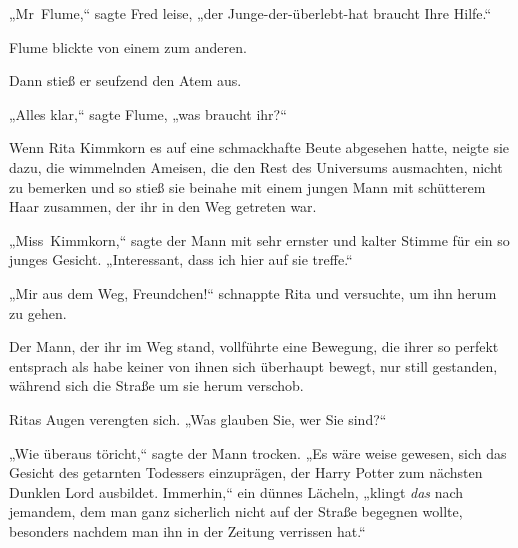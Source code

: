 „Mr~Flume,“ sagte Fred leise, „der Junge-der-überlebt-hat braucht Ihre Hilfe.“

Flume blickte von einem zum anderen.

Dann stieß er seufzend den Atem aus.

„Alles klar,“ sagte Flume, „was braucht ihr?“


Wenn Rita Kimmkorn es auf eine schmackhafte Beute abgesehen hatte, neigte sie dazu, die wimmelnden Ameisen, die den Rest des Universums ausmachten, nicht zu bemerken und so stieß sie beinahe mit einem jungen Mann mit schütterem Haar zusammen, der ihr in den Weg getreten war.

„Miss~Kimmkorn,“ sagte der Mann mit sehr ernster und kalter Stimme für ein so junges Gesicht. „Interessant, dass ich hier auf sie treffe.“

„Mir aus dem Weg, Freundchen!“ schnappte Rita und versuchte, um ihn herum zu gehen.

Der Mann, der ihr im Weg stand, vollführte eine Bewegung, die ihrer so perfekt entsprach als habe keiner von ihnen sich überhaupt bewegt, nur still gestanden, während sich die Straße um sie herum verschob.

Ritas Augen verengten sich. „Was glauben Sie, wer Sie sind?“

„Wie überaus töricht,“ sagte der Mann trocken. „Es wäre weise gewesen, sich das Gesicht des getarnten Todessers einzuprägen, der Harry Potter zum nächsten Dunklen Lord ausbildet. Immerhin,“ ein dünnes Lächeln, „klingt \emph{das} nach jemandem, dem man ganz sicherlich nicht auf der Straße begegnen wollte, besonders nachdem man ihn in der Zeitung verrissen hat.“

